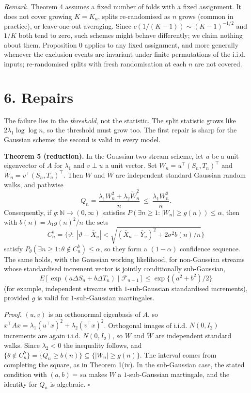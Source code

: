 \documentclass[
  10pt,
  a4paper,
]{article}
\begin{document}
\emph{Remark.} Theorem 4 assumes a fixed number of folds with a fixed
assignment. It does not cover growing \(K=K_n\), splits re-randomised as
\(n\) grows (common in practice), or leave-one-out averaging. Since
\(c(1/(K-1))\sim(K-1)^{-1/2}\) and \(1/K\) both tend to zero, such
schemes might behave differently; we claim nothing about them.
Proposition 0 applies to any fixed assignment, and more generally
whenever the exclusion events are invariant under finite permutations of
the i.i.d. inputs; re-randomised splits with fresh randomisation at each
\(n\) are not covered.

\section{6. Repairs}\label{repairs}

The failure lies in the \emph{threshold}, not the statistic. The split
statistic grows like \(2\lambda_1\log\log n\), so the threshold must
grow too. The first repair is sharp for the Gaussian scheme; the second
is valid in every model.

\textbf{Theorem 5 (reduction).} In the Gaussian two-stream scheme, let
\(u\) be a unit eigenvector of \(A\) for \(\lambda_1\) and \(v\perp u\)
a unit vector. Set \(W_n=u^\top(S_n,T_n)^\top\) and
\(\widetilde W_n=v^\top(S_n,T_n)^\top\). Then \(W\) and \(\widetilde W\)
are independent standard Gaussian random walks, and pathwise \[
Q_n=\frac{\lambda_1W_n^2+\lambda_2\widetilde W_n^2}{n}\ \le\ \frac{\lambda_1W_n^2}{n}.
\] Consequently, if \(g:\mathbb N\to(0,\infty)\) satisfies
\(P(\exists n\ge1:|W_n|\ge g(n))\le\alpha\), then with
\(b(n)=\lambda_1g(n)^2/n\) the sets \[
C^{b}_n=\Big\{\vartheta:\ |\vartheta-\bar X_n|<\sqrt{(\bar X_n-\bar Y_n)^2+2\sigma^2b(n)/n}\Big\}
\] satisfy \(P_\theta(\exists n\ge1:\theta\notin C^b_n)\le\alpha\), so
they form a \((1-\alpha)\) confidence sequence. The same holds, with the
Gaussian working likelihood, for non-Gaussian streams whose standardised
increment vector is jointly conditionally sub-Gaussian,
\[E[\exp(a\Delta S_n+b\Delta T_n)\mid\mathcal F_{n-1}]\le\exp\{(a^2+b^2)/2\}\]
(for example, independent streams with \(1\)-sub-Gaussian standardised
increments), provided \(g\) is valid for \(1\)-sub-Gaussian martingales.

\emph{Proof.} \((u,v)\) is an orthonormal eigenbasis of \(A\), so
\(x^\top Ax=\lambda_1(u^\top x)^2+\lambda_2(v^\top x)^2\). Orthogonal
images of i.i.d. \(N(0,I_2)\) increments are again i.i.d. \(N(0,I_2)\),
so \(W\) and \(\widetilde W\) are independent standard walks. Since
\(\lambda_2<0\) the inequality follows, and
\(\{\theta\notin C^b_n\}=\{Q_n\ge b(n)\}\subseteq\{|W_n|\ge g(n)\}\).
The interval comes from completing the square, as in Theorem 1(iv). In
the sub-Gaussian case, the stated condition with \((a,b)=su\) makes
\(W\) a \(1\)-sub-Gaussian martingale, and the identity for \(Q_n\) is
algebraic. \(\square\)
\end{document}
